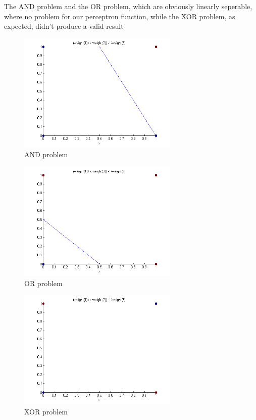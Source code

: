 \documentclass{article}
\begin{document}
The AND problem and the OR problem, which are obviously linearly seperable, where no problem for our perceptron function, while the XOR problem, as expected, didn't produce a valid result

\begin{figure}
    \centering
    \includegraphics[width=3.0in]{and_correct}
    \caption{AND problem}
    \label{andproblem}
\end{figure}

\begin{figure}
    \centering
    \includegraphics[width=3.0in]{or_correct}
    \caption{OR problem}
    \label{orproblem}
\end{figure}

\begin{figure}
    \centering
    \includegraphics[width=3.0in]{xor_wtf}
    \caption{XOR problem}
    \label{xorproblem}
\end{figure}
\end{document}
